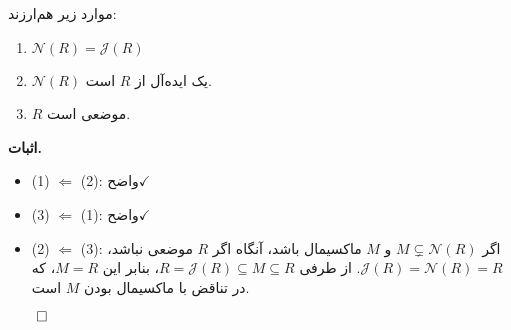 \begin{frame}
    \begin{theorem}
        موارد زیر هم‌ارزند:
        \begin{enumerate}
            \item \(\mathcal{N}(R) = \mathcal{J}(R)\)
            \item \(\mathcal{N}(R)\) یک ایده‌آل از \(R\) است.
            \item \(R\) موضعی است.
        \end{enumerate}
    \end{theorem}

    \textbf{اثبات.}
    
        \begin{itemize}
            \item (1) $\Leftarrow$ (2):  واضح\(\checkmark\)
            \item (3) $\Leftarrow$ (1): واضح\( \checkmark\)
            \item (2) $\Leftarrow$ (3): اگر \( M \subsetneq \mathcal{N}(R) \) و \( M \) ماکسیمال باشد، آنگاه اگر \( R \) موضعی نباشد،
                  \( \mathcal{J}(R) = \mathcal{N}(R) = R\).
                  از طرفی
                  \(R = \mathcal{J}(R) \subseteq M \subseteq R\)،
                  بنابر این
                  \(M = R\)،
                  که در تناقض با ماکسیمال بودن
                  \(M\)
                  است.
        \end{itemize}

        \hfill \(\qed\)
\end{frame}